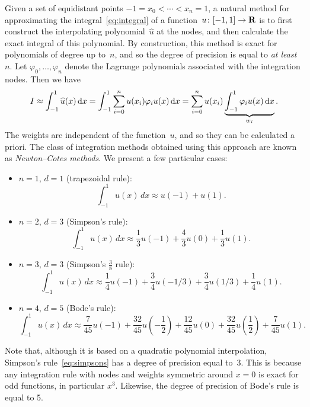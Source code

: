 Given a set of equidistant points $-1 = x_0 < \dotsb < x_n = 1$,
a natural method for approximating the integral~\eqref{eq:integral} of a function~$u\colon [-1, 1] \to \mathbf R$
is to first construct the interpolating polynomial~$\widehat u$ at the nodes,
and then calculate the exact integral of this polynomial.
By construction, this method is exact for polynomials of degree up to~$n$,
and so the degree of precision is equal to \emph{at least}~$n$.
Let $\varphi_0, \dotsc, \varphi_n$ denote the Lagrange polynomials associated with the integration nodes.
Then we have
\[
    I \approx \int_{-1}^{1} \widehat u(x) \, \mathrm d x
    = \int_{-1}^{1} \sum_{i=0}^{n} u(x_i) \varphi_i u(x) \, \mathrm d x
    = \sum_{i=0}^{n} u(x_i) \underbrace{\int_{-1}^{1}  \varphi_i u(x)  \, \mathrm d x}_{w_i}.
\]
The weights are independent of the function~$u$,
and so they can be calculated a priori.
The class of integration methods obtained using this approach are known as \emph{Newton--Cotes methods}.
We present a few particular cases:
\begin{itemize}
    \item
        $n = 1$, $d = 1$ (trapezoidal rule):
        \begin{equation}
            \label{eq:trapezoidal_rule}
            \int_{-1}^{1} u(x) \, dx
            \approx u(-1) + u(1).
        \end{equation}

    \item
        $n = 2$, $d = 3$ (Simpson's rule):
        \begin{equation}
            \label{eq:simpsons}
            \int_{-1}^{1} u(x) \, dx
            \approx \frac{1}{3} u(-1) + \frac{4}{3} u(0) + \frac{1}{3} u(1).
        \end{equation}

    \item
        $n = 3$, $d = 3$ (Simpson's $\frac{3}{8}$ rule):
        \[
            \int_{-1}^{1} u(x) \, dx
            \approx \frac{1}{4} u(-1) + \frac{3}{4} u(-1/3) + \frac{3}{4} u(1/3) + \frac{1}{4} u(1).
        \]

    \item
        $n = 4$, $d = 5$ (Bode's rule):
        \[
            \int_{-1}^{1} u(x) \, dx
            \approx \frac{7}{45} u(-1) + \frac{32}{45} u\left(-\frac{1}{2}\right) + \frac{12}{45} u\left(0\right) + \frac{32}{45} u\left(\frac{1}{2}\right) + \frac{7}{45} u(1).
        \]
\end{itemize}

\begin{remark}
    Note that,
    although it is based on a quadratic polynomial interpolation,
    Simpson's rule~\eqref{eq:simpsons} has a degree of precision equal to~$3$.
    This is because any integration rule with nodes and weights symmetric around $x=0$ is exact for odd functions,
    in particular $x^3$.
    Likewise, the degree of precision of Bode's rule is equal to 5.
\end{remark}

